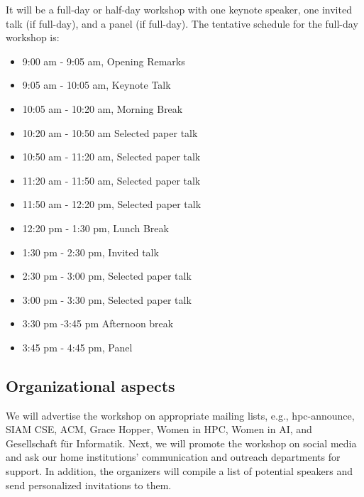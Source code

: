 \documentclass{article}
\begin{document}
It will be a full-day or half-day workshop with one keynote speaker, one invited talk (if full-day), and a panel (if full-day).
The tentative schedule for the full-day workshop is:
\begin{itemize}
\item 9:00 am - 9:05 am, Opening Remarks
\item 9:05 am - 10:05 am, Keynote Talk  
\item 10:05 am - 10:20 am, Morning Break
\item 10:20 am - 10:50 am Selected paper talk
\item 10:50 am - 11:20 am, Selected paper talk
\item 11:20 am - 11:50 am, Selected paper talk
\item 11:50 am - 12:20 pm, Selected paper talk
\item 12:20 pm - 1:30 pm, Lunch Break 
\item 1:30 pm - 2:30 pm, Invited talk 
\item 2:30 pm - 3:00 pm, Selected paper talk
\item 3:00 pm - 3:30 pm, Selected paper talk
\item 3:30 pm -3:45 pm Afternoon break
\item 3:45 pm - 4:45 pm, Panel 
\end{itemize}

\subsection*{Organizational aspects}
We will advertise the workshop on appropriate mailing lists, e.g., hpc-announce, SIAM CSE, ACM, Grace Hopper, Women in HPC, Women in AI, and Gesellschaft für Informatik. 
Next, we will promote the workshop on social media and ask our home institutions’ communication and outreach departments for support. In addition, the organizers will compile a list of potential speakers and send personalized invitations to them. 
\end{document}
